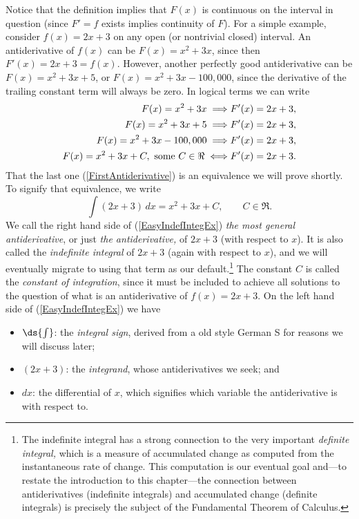 Notice that the definition implies that $F(x)$ is continuous
on the interval in question
(since $F'=f$ exists implies continuity of $F$).  
For a simple example, consider $f(x)=2x+3$ on any open (or nontrivial closed)
interval. An antiderivative of $f(x)$ can be
$F(x)=x^2+3x$, since then $F'(x)=2x+3=f(x)$.  
However, another perfectly good antiderivative
can be $F(x)=x^2+3x+5$, or $F(x)=x^2+3x-100,000$, since the
derivative of the trailing constant term will always be zero.
In logical terms we can write
\begin{align}
F(x)=x^2+3x\implies& F'(x)=2x+3,\notag\\
F(x)=x^2+3x+5\implies& F'(x)=2x+3,\notag\\
F(x)=x^2+3x-100,000\implies& F'(x)=2x+3,\notag\\
F(x)=x^2+3x+C,\text{ some }C\in\Re\iff& F'(x)=2x+3.
\label{FirstAntiderivative}
\end{align}
That the last one (\ref{FirstAntiderivative})
is an equivalence we will prove shortly.
To signify that equivalence, we write
\begin{equation}
\int (2x+3)\,dx=x^2+3x+C,\qquad C\in\Re.\label{EasyIndefIntegEx}\end{equation}
We call the right hand side of (\ref{EasyIndefIntegEx})
{\it the most general antiderivative}, or just
{\it the antiderivative,} of $2x+3$ (with respect to $x$). It is 
also called the {\it indefinite integral} 
of $2x+3$ (again with respect to $x$), and we will
eventually migrate to using that term as our default.\footnote{%
The indefinite integral has a strong connection to the 
very important {\it definite integral, }which is a measure
of accumulated change as computed from the instantaneous
rate of change.  This computation is our eventual goal and---to
restate the introduction to this chapter---the connection 
between antiderivatives (indefinite integrals)
and accumulated change (definite integrals) is precisely the 
subject of the Fundamental Theorem of Calculus.}
The constant
$C$ is called the {\it constant of integration},
since it must be included to achieve all solutions to the question
of what is an antiderivative of $f(x)=2x+3$.
On the left hand side of (\ref{EasyIndefIntegEx})
we have
\begin{itemize}
\item $\ds{\int}$: the {\it integral sign}, derived from a old style German 
           S for reasons we will discuss later;
\item $(2x+3)$: the {\it integrand}, whose antiderivatives we seek; and
\item $dx$: the differential of $x$, which signifies which variable
            the antiderivative is with respect to.
\end{itemize}
